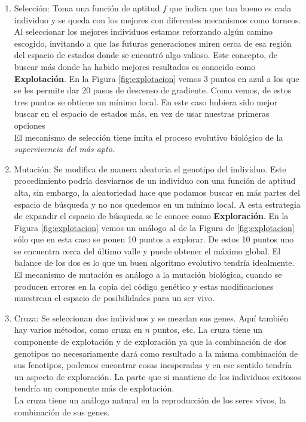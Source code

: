 \begin{enumerate}
    \item Selección: Toma una función de aptitud $f$ que indica que tan bueno es cada individuo y se queda con los mejores con diferentes mecanismos como torneos. Al seleccionar los mejores individuos estamos reforzando algún camino escogido, invitando a que las futuras generaciones miren cerca de esa región del espacio de estados donde se encontró algo valioso. Este concepto, de buscar más donde ha habido mejores resultados es conocido como \textbf{Explotación}. En la Figura \ref{fig:explotacion} vemos 3 puntos en azul a los que se les permite dar 20 pasos de descenso de gradiente. Como vemos, de estos tres puntos se obtiene 
    un mínimo local. En este caso hubiera sido mejor buscar en el espacio de estados más, en vez de usar nuestras primeras opciones \\El mecanismo de selección tiene imita el proceso evolutivo biológico de la \emph{supervivencia del más apto}.
    \item Mutación: Se modifica de manera aleatoria el genotipo del individuo. Este procedimiento podría desviarnos de un individuo con una función de aptitud alta, sin embargo, la aleatoriedad hace que podamos buscar en más partes del espacio de búsqueda y no nos quedemos en un mínimo local. A esta estrategia de expandir el espacio de búsqueda se le conoce como \textbf{Exploración}. En la Figura \ref{fig:explotacion} vemos un análogo al de la Figura de \ref{fig:explotacion} sólo que en esta caso se ponen 10 puntos a explorar. De estos 10 puntos uno se encuentra cerca del último valle y puede obtener el máximo global. El balance de los dos es lo que un buen algoritmo evolutivo tendría idealmente. \\ El mecanismo de mutación es análogo a la mutación biológica, cuando se producen errores en la copia del código genético y estas modificaciones muestrean el espacio de posibilidades para un ser vivo.   
    \item Cruza: Se seleccionan dos individuos y se mezclan sus genes. Aquí también hay varios métodos, como cruza en $n$ puntos, etc. La cruza tiene un componente de explotación y de exploración ya que la combinación de dos genotipos no necesariamente dará como resultado a la misma combinación de sus fenotipos, podemos encontrar cosas inesperadas y en ese sentido tendría un aspecto de exploración. La parte que si mantiene de los individuos exitosos tendría un componente más de explotación. \\La cruza tiene un análogo natural en la reproducción de los seres vivos, la combinación de sus genes. 
\end{enumerate}

